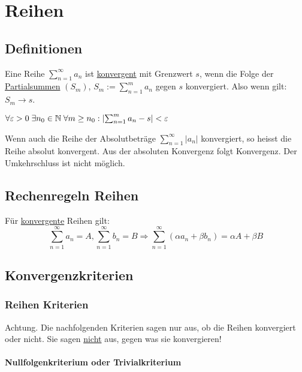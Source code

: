 \section{Reihen}

\subsection{Definitionen}
Eine Reihe $\sum_{n = 1}^\infty a_n$ ist \underline{konvergent} mit Grenzwert
$s$, wenn die Folge der \underline{Partialsummen} $(S_m)$, $S_m :=
\sum_{n=1}^m a_n$ gegen $s$ konvergiert. Also wenn gilt: $S_m \to s$.

\begin{definition}
	$\forall \varepsilon > 0 \; \exists n_0 \in \mathbb{N} \; \forall m \geq n_0: \left|
	\sum_{n=1}^m a_n - s \right| < \varepsilon$
\end{definition}

\begin{definition}
Wenn auch die Reihe der Absolutbeträge $\sum_{n=1}^\infty |a_n|$ konvergiert, so
heisst die Reihe absolut konvergent. Aus der absoluten Konvergenz folgt
Konvergenz. Der Umkehrschluss ist nicht möglich.
\end{definition}

\subsection{Rechenregeln Reihen}
Für \underline{konvergente} Reihen gilt:
\[
	\sum_{n=1}^\infty a_n = A, \sum_{n=1}^\infty b_n = B \Rightarrow
	\sum_{n=1}^\infty (\alpha a_n + \beta b_n) = \alpha A + \beta B
\]

\subsection{Konvergenzkriterien}

\subsubsection{Reihen Kriterien}
Achtung. Die nachfolgenden Kriterien sagen nur aus, ob die Reihen konvergiert
oder nicht. Sie sagen \underline{nicht} aus, gegen was sie konvergieren!

\paragraph{Nullfolgenkriterium oder Trivialkriterium}

